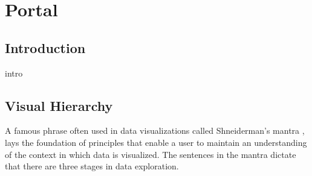 \graphicspath{{Chapter5/Figs/Vector/}{Chapter5/Figs/}}

%
\chapter{Portal}

%
\section{Introduction}
intro

%
%
\section{Visual Hierarchy}
A famous phrase often used in data visualizations called Shneiderman's mantra \cite{mantra}, lays the foundation of principles that enable a user to maintain an understanding of the context in which data is visualized. The sentences in the mantra dictate that there are three stages in data exploration.

